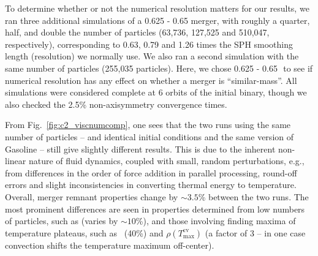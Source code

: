 To determine whether or not the numerical resolution matters for our results, we ran three additional simulations of a 0.625 - 0.65 {\Msun} merger, with roughly a quarter, half, and double the number of particles (63,736, 127,525 and 510,047, respectively), corresponding to 0.63, 0.79 and 1.26 times the SPH smoothing length (resolution) we normally use.  We also ran a second simulation with the same number of particles (255,035 particles).  Here, we chose 0.625 - 0.65\,\Msun\ to see if numerical resolution has any effect on whether a merger is ``similar-mass''.  All simulations were considered complete at 6 orbits of the initial binary, though we also checked the 2.5\% non-axisymmetry convergence times.

From Fig.~\ref{fig:c2_viscnumcomp}, one sees that the two runs using the same number of particles -- and identical initial conditions and the same version of Gasoline -- still give slightly different results.  This is due to the inherent non-linear nature of fluid dynamics, coupled with small, random perturbations, e.g., from differences in the order of force addition in parallel processing, round-off errors and slight inconsistencies in converting thermal energy to temperature.  Overall, merger remnant properties change by $\sim3.5$\% between the two runs.  The most prominent differences are seen in properties determined from low numbers of particles, such as {\Tc} (varies by $\sim10$\%), and those involving finding maxima of temperature plateaus, such as \zrhoTmax\ (40\%) and $\rho(T^\mathrm{cv}_\mathrm{max})$ (a factor of 3 -- in one case convection shifts the temperature maximum off-center).


